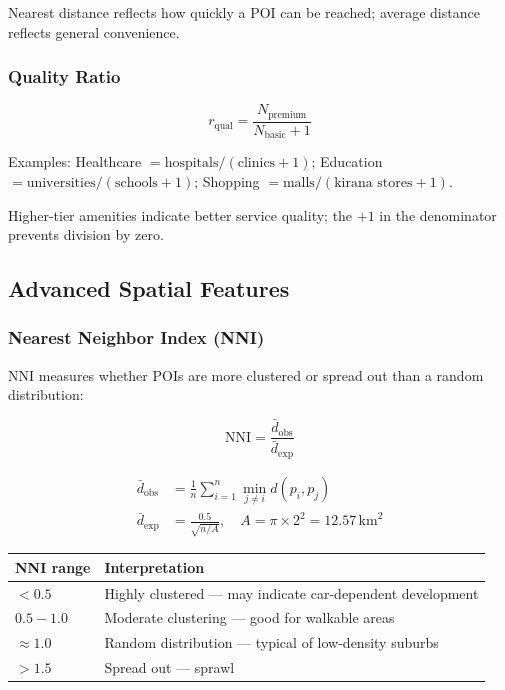 \documentclass[11pt,a4paper]{article}
\begin{document}
Nearest distance reflects how quickly a POI can be reached; average distance reflects general convenience.

\subsubsection{Quality Ratio}

\begin{equation}
r_{\text{qual}} = \frac{N_{\text{premium}}}{N_{\text{basic}} + 1}
\end{equation}

Examples: Healthcare $= \text{hospitals}/(\text{clinics}+1)$; Education $= \text{universities}/(\text{schools}+1)$; Shopping $= \text{malls}/(\text{kirana stores}+1)$.

Higher-tier amenities indicate better service quality; the $+1$ in the denominator prevents division by zero.

\subsection{Advanced Spatial Features}

\subsubsection{Nearest Neighbor Index (NNI)}

NNI measures whether POIs are more clustered or spread out than a random distribution:

\begin{equation}
\text{NNI} = \frac{\bar{d}_{\text{obs}}}{\bar{d}_{\text{exp}}}
\end{equation}

\begin{align}
\bar{d}_{\text{obs}} &= \frac{1}{n}\sum_{i=1}^{n}\min_{j\neq i} d(p_i,p_j) \\[4pt]
\bar{d}_{\text{exp}} &= \frac{0.5}{\sqrt{n/A}}, \quad A = \pi\times 2^2 = 12.57\,\text{km}^2
\end{align}

\begin{center}
\begin{tabular}{@{}ll@{}}
\toprule
\textbf{NNI range} & \textbf{Interpretation} \\ \midrule
$< 0.5$      & Highly clustered --- may indicate car-dependent development \\
$0.5 - 1.0$  & Moderate clustering --- good for walkable areas \\
$\approx 1.0$& Random distribution --- typical of low-density suburbs \\
$> 1.5$      & Spread out --- sprawl \\ \bottomrule
\end{tabular}
\end{center}
\end{document}
